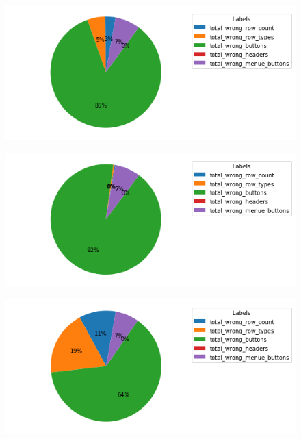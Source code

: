 \documentclass[pdftex,a4paper,halfparskip, article]{scrartcl}
\begin{document}
\begin{figure}
\centering
\begin{minipage}{.5\textwidth}
  \centering
  \includegraphics[width=1\linewidth]{predictions_bin10_total_error_types_pie_chart}
  \label{fig:fehler_gesamt_bin10}
\end{minipage}%
\begin{minipage}{.5\textwidth}
  \centering
  \includegraphics[width=1\linewidth]{predictions_bin10_excluded_p80_error_types_pie_chart}
  \label{fig:fehler_beste80_bin10}
\end{minipage}
\begin{minipage}{.5\textwidth}
  \centering
   \includegraphics[width=1\linewidth]{predictions_bin10_p80_error_types_pie_chart}
  \label{fig:fehler_schlechteste20_bin10}
\end{minipage}%
\end{figure}
\end{document}
